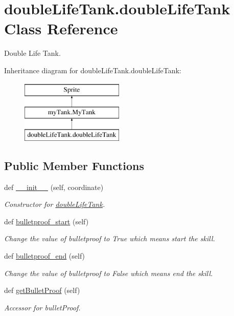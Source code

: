 \hypertarget{classdouble_life_tank_1_1double_life_tank}{}\section{double\+Life\+Tank.\+double\+Life\+Tank Class Reference}
\label{classdouble_life_tank_1_1double_life_tank}


Double Life Tank.  


Inheritance diagram for double\+Life\+Tank.\+double\+Life\+Tank\+:\begin{figure}[H]
\begin{center}
\leavevmode
\includegraphics[height=3.000000cm]{classdouble_life_tank_1_1double_life_tank}
\end{center}
\end{figure}
\subsection*{Public Member Functions}
\begin{DoxyCompactItemize}
\item 
def \mbox{\hyperlink{classdouble_life_tank_1_1double_life_tank_ad27cec1b61748291063b450bf31d4812}{\+\_\+\+\_\+init\+\_\+\+\_\+}} (self, coordinate)
\begin{DoxyCompactList}\small\item\em Constructor for \mbox{\hyperlink{classdouble_life_tank_1_1double_life_tank}{double\+Life\+Tank}}. \end{DoxyCompactList}\item 
def \mbox{\hyperlink{classdouble_life_tank_1_1double_life_tank_a31d43e85cd2c5b01d0877dbbeca866a5}{bulletproof\+\_\+start}} (self)
\begin{DoxyCompactList}\small\item\em Change the value of bulletproof to True which means start the skill. \end{DoxyCompactList}\item 
def \mbox{\hyperlink{classdouble_life_tank_1_1double_life_tank_a2db7f3a483f7c1c6b2e4b61266509389}{bulletproof\+\_\+end}} (self)
\begin{DoxyCompactList}\small\item\em Change the value of bulletproof to False which means end the skill. \end{DoxyCompactList}\item 
def \mbox{\hyperlink{classdouble_life_tank_1_1double_life_tank_a597715fc6b108e6d5f75417913371915}{get\+Bullet\+Proof}} (self)
\begin{DoxyCompactList}\small\item\em Accessor for bullet\+Proof. \end{DoxyCompactList}\end{DoxyCompactItemize}
